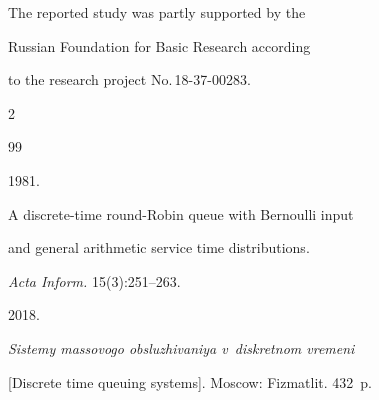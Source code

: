 





 \Ack

\noindent

The reported study was partly supported by the

Russian Foundation for Basic Research according

to the research project No.\,18-37-00283.








  \begin{multicols}{2}



\renewcommand{\bibname}{\protect\rmfamily References}




{\small\frenchspacing

 {%


 \begin{thebibliography}{99}






 1981.

A discrete-time round-Robin queue with Bernoulli input

and general arithmetic service time distributions.

\textit{Acta Inform.} 15(3):251--263.






 2018.

\textit{Sistemy massovogo obsluzhivaniya v~diskretnom vremeni}

[Discrete time queuing systems]. Moscow: Fizmatlit. 432~p.







\end{thebibliography}}}
\end{multicols}
